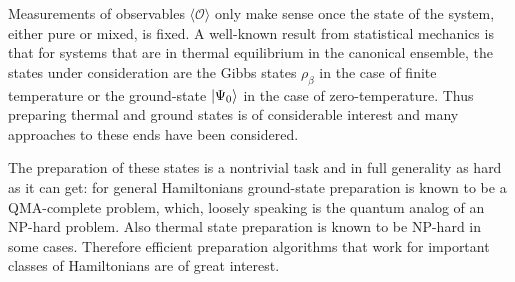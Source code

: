 \documentclass[12pt,a4paper]{article}
\newcommand{\SA}[1]{{\color{orange}{[SA: #1]}}}
\begin{document}

Measurements of observables $\langle \mathcal{O} \rangle$  only make sense once the state of the system, either pure or mixed, is fixed. A well-known result from statistical mechanics is that for systems that are in thermal equilibrium in the canonical ensemble, the states under consideration are the Gibbs states $\rho_{\beta}$ in the case of finite temperature or the ground-state $\ket{\Psi_0}$ in the case of zero-temperature.  Thus preparing thermal and ground states is of considerable interest and many approaches to these ends have been considered. 

The preparation of these states is a nontrivial task and in full generality as hard as it can get: for general Hamiltonians ground-state preparation is known to be a QMA-complete problem, which, loosely speaking is the quantum analog of an NP-hard problem. Also thermal state preparation is known to be NP-hard in some cases. Therefore efficient preparation algorithms that work for important classes of Hamiltonians are of great interest.
\end{document}

